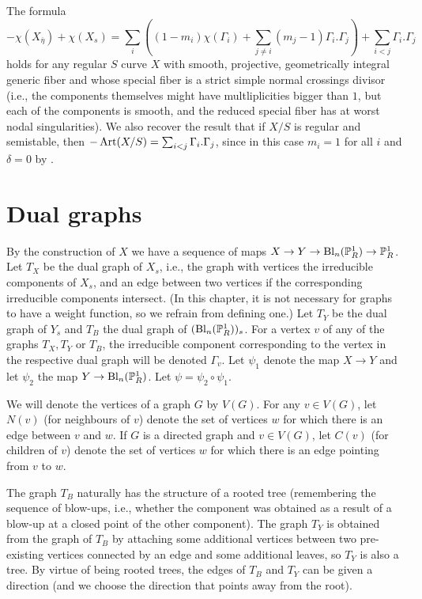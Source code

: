 \begin{remark}
 \textup{The formula 
 \[ -\chi(X_{\overline{\eta}}) + \chi(X_s) = \sum_i \left( (1-m_i)\chi(\Gamma_i) + \sum_{j \neq i} (m_j-1) \Gamma_i.\Gamma_j \right) + \sum_{i < j} \Gamma_i.\Gamma_j \]
 holds for any regular $S$ curve $X$ with smooth, projective, geometrically integral generic fiber and whose special fiber is a strict simple normal crossings divisor (i.e., the components themselves might have multliplicities bigger than $1$, but each of the components is smooth, and the reduced special fiber has at worst nodal singularities). We also recover the result that if $X/S$ is regular and semistable, then $-\Art (X/S) = \sum_{i < j} \Gamma_i.\Gamma_j$, since in this case $m_i = 1$ for all $i$ and $\delta = 0$ by \cite[Theorem~3]{saito1}.}
\end{remark}

\section{Dual graphs}\label{dualgraphs}
By the construction of $X$ we have a sequence of maps $X \rightarrow Y \rightarrow \mathrm{Bl}_n(\P^1_R) \rightarrow \P^1_R$. Let $T_X$ be the dual graph of $X_s$, i.e., the graph with vertices the irreducible components of $X_s$, and an edge between two vertices if the corresponding irreducible components intersect. (In this chapter, it is not necessary for graphs to have a weight function, so we refrain from defining one.) Let $T_Y$ be the dual graph of $Y_s$ and $T_B$ the dual graph of $(\mathrm{Bl}_n(\P^1_R))_s$.  For a vertex $v$ of any of the graphs $T_X,T_Y$ or $T_B$, the irreducible component corresponding to the vertex in the respective dual graph will be denoted $\Gamma_v$. Let $\psi_1$ denote the map $X \rightarrow Y$ and let $\psi_2$ the map $Y \rightarrow \mathrm{Bl}_n(\P^1_R)$. Let $\psi = \psi_2 \circ \psi_1$. 

We will denote the vertices of a graph $G$ by $V(G)$. For any $v \in V(G)$, let $N(v)$ (for neighbours of $v$) denote the set of vertices $w$ for which there is an edge between $v$ and $w$. If $G$ is a directed graph and $v \in V(G)$, let $C(v)$ (for children of $v$) denote the set of vertices $w$ for which there is an edge pointing from $v$ to $w$. 

The graph $T_B$ naturally has the structure of a rooted tree (remembering the sequence of blow-ups, i.e., whether the component was obtained as a result of a blow-up at a closed point of the other component). The graph $T_Y$ is obtained from the graph of $T_B$ by attaching some additional vertices between two pre-existing vertices connected by an edge and some additional leaves, so $T_Y$ is also a tree. By virtue of being rooted trees, the edges of $T_B$ and $T_Y$ can  be given a direction (and we choose the direction that points away from the root). 

